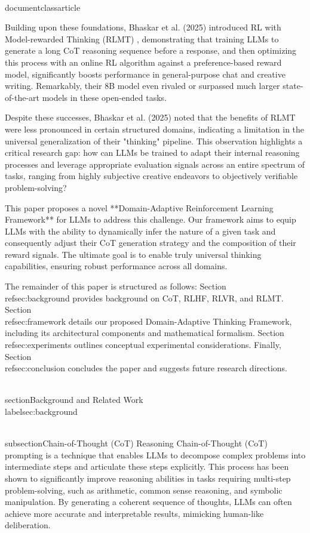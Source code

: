 \\documentclass{article}
\begin{document}
Building upon these foundations, Bhaskar et al. (2025) introduced RL with Model-rewarded Thinking (RLMT) \cite{bhaskar2025language}, demonstrating that training LLMs to generate a long CoT reasoning sequence before a response, and then optimizing this process with an online RL algorithm against a preference-based reward model, significantly boosts performance in general-purpose chat and creative writing. Remarkably, their 8B model even rivaled or surpassed much larger state-of-the-art models in these open-ended tasks.

Despite these successes, Bhaskar et al. (2025) noted that the benefits of RLMT were less pronounced in certain structured domains, indicating a limitation in the universal generalization of their "thinking" pipeline. This observation highlights a critical research gap: how can LLMs be trained to adapt their internal reasoning processes and leverage appropriate evaluation signals across an entire spectrum of tasks, ranging from highly subjective creative endeavors to objectively verifiable problem-solving?

This paper proposes a novel **Domain-Adaptive Reinforcement Learning Framework** for LLMs to address this challenge. Our framework aims to equip LLMs with the ability to dynamically infer the nature of a given task and consequently adjust their CoT generation strategy and the composition of their reward signals. The ultimate goal is to enable truly universal thinking capabilities, ensuring robust performance across all domains.

The remainder of this paper is structured as follows: Section \\ref{sec:background} provides background on CoT, RLHF, RLVR, and RLMT. Section \\ref{sec:framework} details our proposed Domain-Adaptive Thinking Framework, including its architectural components and mathematical formalism. Section \\ref{sec:experiments} outlines conceptual experimental considerations. Finally, Section \\ref{sec:conclusion} concludes the paper and suggests future research directions.

\\section{Background and Related Work}
\\label{sec:background}

\\subsection{Chain-of-Thought (CoT) Reasoning}
Chain-of-Thought (CoT) prompting \cite{wei2022chain} is a technique that enables LLMs to decompose complex problems into intermediate steps and articulate these steps explicitly. This process has been shown to significantly improve reasoning abilities in tasks requiring multi-step problem-solving, such as arithmetic, common sense reasoning, and symbolic manipulation. By generating a coherent sequence of thoughts, LLMs can often achieve more accurate and interpretable results, mimicking human-like deliberation.
\end{document}
